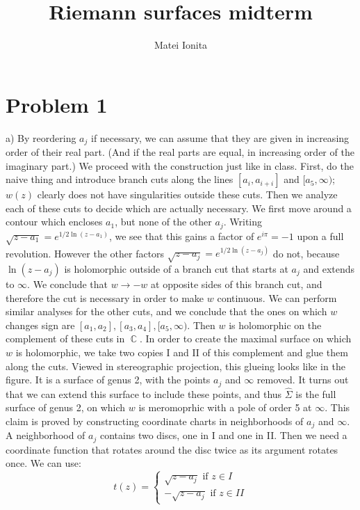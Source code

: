 \documentclass[12 pt]{article}
\title{Riemann surfaces midterm}
\author{Matei Ionita}
\DeclareMathOperator {\C} {\mathbb{C}}
\theoremstyle{plain}
\theoremstyle{definition}
\theoremstyle{remark}
\begin{document}
  \maketitle

\section*{Problem 1}
a) By reordering $a_j$ if necessary, we can assume that they are given in increasing order of their real part. (And if the real parts are equal, in increasing order of the imaginary part.) We proceed with the construction just like in class. First, do the naive thing and introduce branch cuts along the lines $[a_i , a_{i+i}]$ and $[a_5 , \infty)$; $w(z)$ clearly does not have singularities outside these cuts. Then we analyze each of these cuts to decide which are actually necessary. We first move around a contour which encloses $a_1$, but none of the other $a_j$. Writing $\sqrt{z - a_1} = e^{1/2 \ln(z-a_1)}$, we see that this gains a factor of $e^{i\pi} = -1$ upon a full revolution. However the other factors $\sqrt{z-a_j} = e^{1/2 \ln(z-a_j)}$ do not, because $\ln(z-a_j)$ is holomorphic outside of a branch cut that starts at $a_j$ and extends to $\infty$. We conclude that $w \to -w$ at opposite sides of this branch cut, and therefore the cut is necessary in order to make $w$ continuous. We can perform similar analyses for the other cuts, and we conclude that the ones on which $w$ changes sign are $[a_1, a_2] , [a_3, a_4], [a_5, \infty)$. Then $w$ is holomorphic on the complement of these cuts in $\C$. In order to create the maximal surface on which $w$ is holomorphic, we take two copies I and II of this complement and glue them along the cuts. Viewed in stereographic projection, this glueing looks like in the figure. It is a surface of genus 2, with the points $a_j$ and $\infty$ removed. 
\vspace{5cm}
It turns out that we can extend this surface to include these points, and thus $\hat \Sigma$ is the full surface of genus 2, on which $w$ is meromoprhic with a pole of order 5 at $\infty$. This claim is proved by constructing coordinate charts in neighborhoods of $a_j$ and $\infty$. A neighborhood of $a_j$ contains two discs, one in I and one in II. Then we need a coordinate function that rotates around the disc twice as its argument rotates once. We can use:
\[     t(z) = \left\{  \begin{array} {c}  \sqrt{z-a_j} \text{ if } z\in I \\ -\sqrt{z-a_j} \text{ if } z\in II  \end{array} \right.      \]
\end{document}
